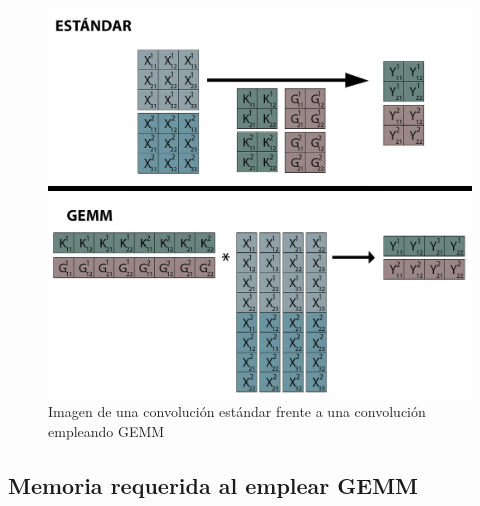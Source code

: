 \begin{figure}[H]
	\centering
	\includegraphics[scale=0.35]{imagenes/conv_std_vs_gemm.jpg}  
	\caption{Imagen de una convolución estándar frente a una convolución empleando GEMM}
	\label{fig:conv_std_vs_gemm}
\end{figure}

\subsection{Memoria requerida al emplear GEMM}

